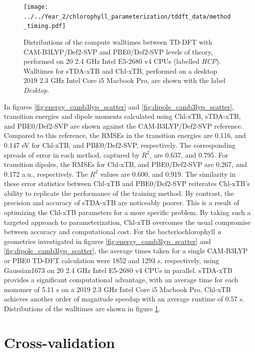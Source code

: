 \begin{figure}
    \centering
    \texttt{[image: ../../Year\_2/chlorophyll\_parameterization/tddft\_data/method\_timing.pdf]}
    \caption{Distributions of the compute walltimes between TD-DFT with CAM-B3LYP/Def2-SVP 
    and PBE0/Def2-SVP levels of theory, performed on 20 2.4 GHz Intel E5-2680 v4 CPUs (labelled \emph{HCP}).
    Walltimes for sTDA-xTB and Chl-xTB, performed on a desktop 2019 2.3 GHz Intel Core i5 Macbook Pro,
    are shown with the label \emph{Desktop}.}
    \label{fig:method_timing}
\end{figure}

In figures \ref{fig:energy_camb3lyp_scatter} and \ref{fig:dipole_camb3lyp_scatter}, 
transition energies and dipole moments calculated using Chl-xTB, sTDA-xTB, and PBE0/Def2-SVP
are shown against the CAM-B3LYP/Def2-SVP reference. Compared to this reference, 
the RMSEs in the transition energies are 0.116, and 0.147 eV for Chl-xTB, and PBE0/Def2-SVP,
respectively. The corresponding spreads of error in each method, captured by $R^2$,
are 0.637, and 0.795. For transition dipoles, the RMSEs for Chl-xTB, and PBE0/Def2-SVP
are 0.267, and 0.172 a.u., respectively. The $R^2$ values are 0.600, and 0.919. 
The similarity in these error statistics between Chl-xTB and PBE0/Def2-SVP reiterates 
Chl-xTB's ability to replicate the performance of the training method. By contrast,
the precision and accuracy of sTDA-xTB are noticeably poorer. This is a result of 
optimizing the Chl-xTB parameters for a more specific problem. By taking such a 
targeted approach to parameterization, Chl-xTB overcomes the usual compromise between 
accuracy and computational cost. For the bacteriochlorophyll \emph{a} geometries 
investigated in figures \ref{fig:energy_camb3lyp_scatter} and \ref{fig:dipole_camb3lyp_scatter},
the average times taken for a single CAM-B3LYP or PBE0 TD-DFT calculation were 1852
and 1293 s, respectively, using Gaussian1673 on 20 2.4 GHz Intel E5-2680 v4 CPUs 
in parallel. sTDA-xTB provides a significant computational advantage, with an average 
time for each monomer of 5.11 s on a 2019 2.3 GHz Intel Core i5 Macbook Pro. Chl-xTB 
achieves another order of magnitude speedup with an average runtime of 0.57 s. Distributions 
of the walltimes are shown in figure \ref{fig:method_timing}.

\afterpartskip
\section{Cross-validation}
\label{sec:chl_benchmarking}

